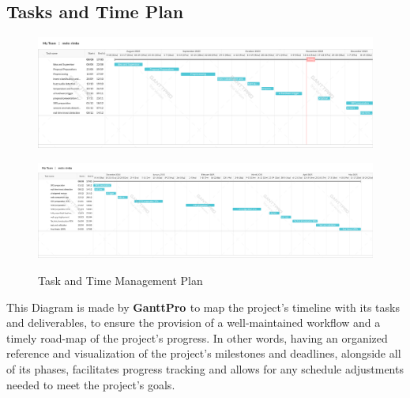 \documentclass[12pt]{article}
\begin{document}
	\subsection{Tasks and Time Plan}
	\vspace{ 1 cm}
	\begin{figure}[H]
		\centering
		\includegraphics[width=\textwidth]{Images/Management/mele1.png}
	\end{figure}
	\begin{figure}[H]
		\centering
		\includegraphics[width=\textwidth]{Images/Management/mele2.png}
		\label{fig:CHART}
		\caption{Task and Time Management Plan}
	\end{figure}
	\vspace{2 cm}
	This Diagram is made by \textbf{GanttPro \cite{ganttpro}} to map the project's timeline with its tasks and deliverables, to ensure the provision of a well-maintained workflow and a timely road-map of the project's progress. In other words, having an organized reference and visualization of the project's milestones and deadlines, alongside all of its phases, facilitates progress tracking and allows for any schedule adjustments needed to meet the project's goals.
	\newpage
\end{document}
